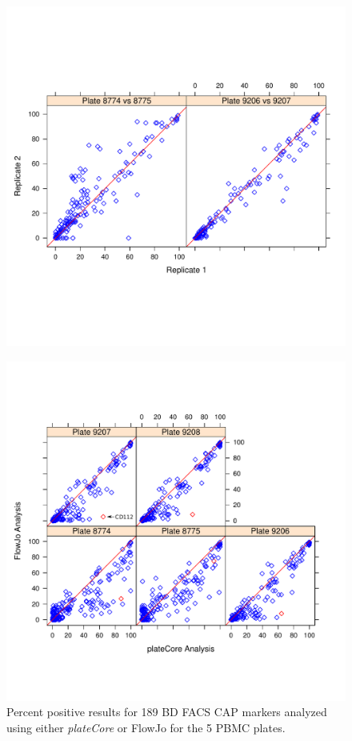 \documentclass[12pt]{article}
\newcommand{\Rpackage}[1]{{\textit{#1}}}
\begin{document}
\begin{figure}
\centering
\includegraphics{replicate.pdf}
\caption{}
\label{fig:replicate}
\end{figure}

\begin{figure}
\centering
\includegraphics{fjVSr.pdf}
\caption{Percent positive results for 189 BD FACS CAP markers analyzed using
either \Rpackage{plateCore} or FlowJo for the 5 PBMC plates. }
\label{fig:pcVSman}
\end{figure}
\end{document}
